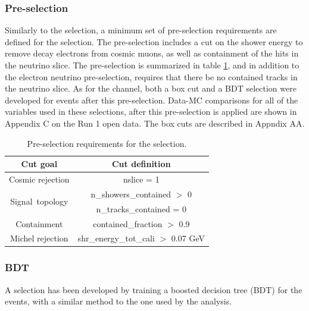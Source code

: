 \subsubsection{Pre-selection}
Similarly to the \npsel selection, a minimum set of pre-selection requirements are defined for the \zpsel selection.   
The pre-selection includes a cut on the shower energy to remove decay electrons from cosmic muons, as well as containment of the hits in the neutrino slice. 
The \zpsel pre-selection is summarized in table \ref{tab:1e0p:presel}, and in addition to the electron neutrino pre-selection, requires that there be no contained tracks in the neutrino slice. As for the \npsel channel, both a box cut and a BDT selection were developed for \zpsel events after this pre-selection. Data-MC comparisons for all of the variables used in these selections, after this pre-selection is applied are shown in Appendix C on the Run 1 open data.  The box cuts are described in Appndix AA.

\begin{table}[h!]
\centering
\setlength{\tabcolsep}{10pt}
\renewcommand{\arraystretch}{1.25}
 \begin{tabular}{| c | c |} 
 \hline
 Cut goal & Cut definition \\
 \hline\hline
\multirow{1}{*}{Cosmic rejection} & nslice = 1 \\
 \hline
\multirow{2}{*}{Signal~topology} & n\_showers\_contained $> $ 0 \\
 & n\_tracks\_contained = 0\\ %
 \hline
Containment & contained\_fraction $>$ 0.9 \\
 \hline
Michel rejection & shr\_energy\_tot\_cali $>$ 0.07 GeV \\
 \hline
 \end{tabular}
 \caption{\label{tab:1e0p:presel} Pre-selection requirements for the \zpsel selection.}
\end{table}

\subsubsection{BDT}

A selection has been developed by training a boosted decision tree (BDT) for the \zpsel events, with a similar method to the one used by the \npsel analysis.  


